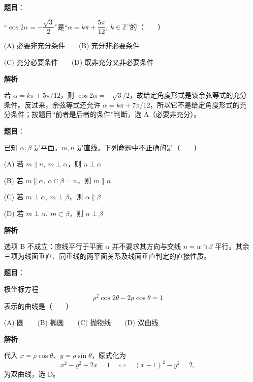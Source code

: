 \begin{answer}

\textbf{题目}：

“\(\cos 2\alpha=-\dfrac{\sqrt3}{2}\)”是“\(\alpha=k\pi+\dfrac{5\pi}{12},\ k\in\mathbb Z\)”的\mbox{（　　）}

   (A) 必要非充分条件　　(B) 充分非必要条件

   (C) 充分必要条件　　(D) 既非充分又非必要条件

\textbf{解析}

若 \(\alpha=k\pi+5\pi/12\)，则 \(\cos2\alpha=-\sqrt3/2\)，故给定角度形式是该余弦等式的充分条件。反过来，余弦等式还允许 \(\alpha=k\pi+7\pi/12\)，所以它不是给定角度形式的充分条件；按题目“前者是后者的条件”判断，选 A（必要非充分）。


\end{answer}
\begin{answer}

\textbf{题目}：

已知 \(\alpha,\beta\) 是平面，\(m,n\) 是直线。下列命题中不正确的是\mbox{（　　）}

   (A) 若 \(m\parallel n,\ m\perp\alpha\)，则 \(n\perp\alpha\)

   (B) 若 \(m\parallel\alpha,\ \alpha\cap\beta=n\)，则 \(m\parallel n\)

   (C) 若 \(m\perp\alpha,\ m\perp\beta\)，则 \(\alpha\parallel\beta\)

   (D) 若 \(m\perp\alpha,\ m\subset\beta\)，则 \(\alpha\perp\beta\)

\textbf{解析}

选项 B 不成立：直线平行于平面 \(\alpha\) 并不要求其方向与交线 \(n=\alpha\cap\beta\) 平行。其余三项为线面垂直、同垂线的两平面关系及线面垂直判定的直接性质。


\end{answer}
\begin{answer}

\textbf{题目}：

极坐标方程
\nopagebreak[4]
\[
   \rho^2\cos 2\theta-2\rho\cos\theta=1
\]
   表示的曲线是\mbox{（　　）}

   (A) 圆　　(B) 椭圆　　(C) 抛物线　　(D) 双曲线

\textbf{解析}

代入 \(x=\rho\cos\theta\)、\(y=\rho\sin\theta\)，原式化为
\nopagebreak[4]
\[
x^2-y^2-2x=1\quad\Longleftrightarrow\quad (x-1)^2-y^2=2,
\]
为双曲线，选 D。


\end{answer}
